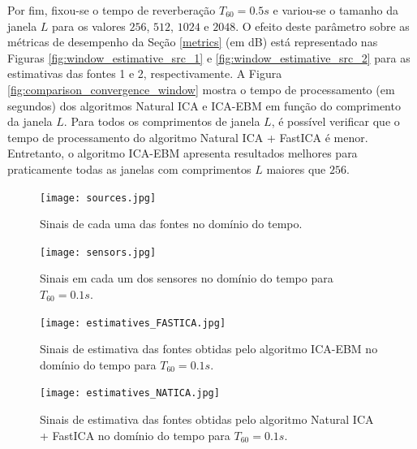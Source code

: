     Por fim, fixou-se o tempo de reverberação $T_{60}=0.5s$ e variou-se o tamanho da janela $L$ para os valores $256$, $512$, $1024$ e $2048$. O efeito deste parâmetro sobre as métricas de desempenho da Seção \ref{metrics} (em dB) está representado nas Figuras \ref{fig:window_estimative_src_1} e \ref{fig:window_estimative_src_2} para as estimativas das fontes 1 e 2, respectivamente. A Figura \ref{fig:comparison_convergence_window} mostra o tempo de processamento (em segundos) dos algoritmos Natural ICA e ICA-EBM em função do comprimento da janela $L$. Para todos os comprimentos de janela $L$, é possível verificar que o tempo de processamento do algoritmo Natural ICA + FastICA é menor. Entretanto, o algoritmo ICA-EBM apresenta resultados melhores para praticamente todas as janelas com comprimentos $L$ maiores que $256$.
    
    \begin{figure}
        \centering
        \texttt{[image: sources.jpg]}
            \caption{Sinais de cada uma das fontes no domínio do tempo.}
        \label{fig:sources}
        \texttt{[image: sensors.jpg]}
            \caption{Sinais em cada um dos sensores no domínio do tempo para $T_{60} = 0.1s$.}
        \label{fig:sensors}
    \end{figure}
    
    \begin{figure}
        \centering
        \texttt{[image: estimatives\_FASTICA.jpg]}
            \caption{Sinais de estimativa das fontes obtidas pelo algoritmo ICA-EBM no domínio do tempo para $T_{60} = 0.1s$.}
        \label{fig:icaebm}
        \texttt{[image: estimatives\_NATICA.jpg]}
            \caption{Sinais de estimativa das fontes obtidas pelo algoritmo Natural ICA + FastICA  no domínio do tempo para $T_{60} = 0.1s$.}
        \label{fig:natica}
    \end{figure}
    
